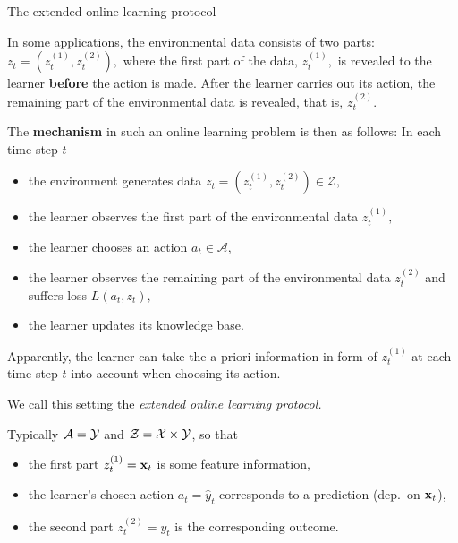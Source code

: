 \documentclass[11pt,compress,t,notes=noshow, xcolor=table]{beamer}
\renewcommand{\l}{L}
\begin{document}
\begin{frame}{The extended online learning protocol}
\footnotesize
\begin{itemize}
	 \item In some applications, the environmental data consists of two parts: $z_{t} = (z_{t}^{(1)}, z_{t}^{(2)}),$ where the first part of the data, $z_{t}^{(1)},$ is revealed to the learner \textbf{before} the action is made.
	After the learner carries out its action, the remaining part of the environmental data is revealed, that is, $z_{t}^{(2)}.$
	{ {  \item The \textbf{mechanism} in such an online learning problem is then as follows: In each time step $t$
	\begin{itemize}\footnotesize
		 \item the environment generates data $z_{t} = (z_{t}^{(1)}, z_{t}^{(2)}) \in \mathcal{Z},$
		 \item the learner observes the first part of the environmental data $ z_{t}^{(1)},$
		 \item the learner chooses an action $a_{t} \in \mathcal{A},$  
		 \item the learner observes the remaining part of the environmental data $z_{t}^{(2)}$ and suffers loss $\l(a_{t},z_{t}),$ 
		 \item the learner updates its knowledge base.
	\end{itemize} }}
	{ {  \item Apparently, the learner can  take the a priori information in form of $ z_{t}^{(1)}$ at each time step $t$ into account when choosing its action. }}
	{ {  \item We call this setting the \emph{extended online learning protocol.}	}}
%	 
	 { { \item 	Typically $\mathcal{A} = \mathcal{Y}$ and  $ \mathcal{Z} = \mathcal{X} \times \mathcal{Y}$, so that
	 		\begin{itemize}\footnotesize
	 			\item the first part $z_{t}^{(1)} = \mathbf{x}_t$ is some feature information,
	 			\item the learner's chosen action $a_{t} = \hat{y}_t$ corresponds to a prediction (dep.\ on $\mathbf{x}_t$),
%	 			
				\item the second part $z_{t}^{(2)} =y_t$ is the corresponding outcome.
%	 			
	 \end{itemize}}}	
\end{itemize}
%
\end{frame}
\end{document}
